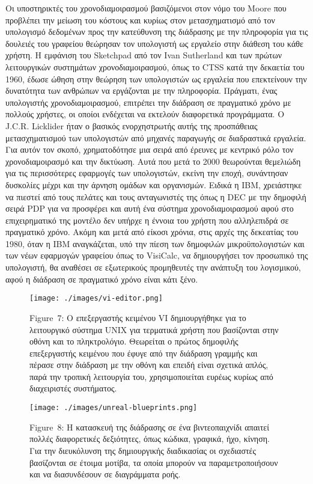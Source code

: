 \documentclass[
]{article}
\begin{document}
Οι υποστηρικτές του χρονοδιαμοιρασμού βασιζόμενοι στον νόμο του Moore
που προβλέπει την μείωση του κόστους και κυρίως στον μετασχηματισμό από
τον υπολογισμό δεδομένων προς την κατεύθυνση της διάδρασης με την
πληροφορία για τις δουλειές του γραφείου θεώρησαν τον υπολογιστή ως
εργαλείο στην διάθεση του κάθε χρήστη. Η εμφάνιση του Sketchpad από τον
Ivan Sutherland και των πρώτων λειτουργικών συστημάτων
χρονοδιαμοιρασμού, όπως το CTSS κατά την δεκαετία του 1960, έδωσε ώθηση
στην θεώρηση των υπολογιστών ως εργαλεία που επεκτείνουν την δυνατότητα
των ανθρώπων να εργάζονται με την πληροφορία. Πράγματι, ένας υπολογιστής
χρονοδιαμοιρασμού, επιτρέπει την διάδραση σε πραγματικό χρόνο με πολλούς
χρήστες, οι οποίοι ενδέχεται να εκτελούν διαφορετικά προγράμματα. Ο
J.C.R. Licklider ήταν ο βασικός ενορχηστρωτής αυτής της προσπάθειας
μετασχηματισμού των υπολογιστών από μηχανές παραγωγής σε διαδραστικά
εργαλεία. Για αυτόν τον σκοπό, χρηματοδότησε μια σειρά από έρευνες με
κεντρικό ρόλο τον χρονοδιαμοιρασμό και την δικτύωση. Αυτά που μετά το
2000 θεωρούνται θεμελιώδη για τις περισσότερες εφαρμογές των
υπολογιστών, εκείνη την εποχή, συνάντησαν δυσκολίες μέχρι και την άρνηση
ομάδων και οργανισμών. Ειδικά η IBM, χρειάστηκε να πιεστεί από τους
πελάτες και τους ανταγωνιστές της όπως η DEC με την δημοφιλή σειρά PDP
για να προσφέρει και αυτή ένα σύστημα χρονοδιαμοιρασμού αφού στο
επιχειρηματικό της μοντέλο δεν υπήρχε η έννοια του χρήστη που
αλληλεπιδρά σε πραγματικό χρόνο. Ακόμη και μετά από είκοσι χρόνια, στις
αρχές της δεκεατίας του 1980, όταν η ΙΒΜ αναγκάζεται, υπό την πίεση των
δημοφιλών μικροϋπολογιστών και των νέων εφαρμογών γραφείου όπως το
VisiCalc, να δημιουργήσει τον προσωπικό της υπολογιστή, θα αναθέσει σε
εξωτερικούς προμηθευτές την ανάπτυξη του λογισμικού, αφού η διάδραση σε
πραγματικό χρόνο είναι κάτι ξένο.

\leavevmode{}%
\begin{figure}
\hypertarget{fig:vi-editor}{%
\centering
\texttt{[image: ./images/vi-editor.png]}
\caption{Figure~7: Ο επεξεργαστής κειμένου VI δημιουργήθηκε για το
λειτουργικό σύστημα UNIX για τερματικά χρήστη που βασίζονται στην οθόνη
και το πληκτρολόγιο. Θεωρείται ο πρώτος δημοφιλής επεξεργαστής κειμένου
που έφυγε από την διάδραση γραμμής και πέρασε στην διάδραση με την οθόνη
και επειδή είναι σχετικά απλός, παρά την τροπική λειτουργία του,
χρησιμοποιείται ευρέως κυρίως από διαχειριστές
συστήματος.}\label{fig:vi-editor}
}
\end{figure}

\leavevmode{}%
\begin{figure}
\hypertarget{fig:unreal-blueprints}{%
\centering
\texttt{[image: ./images/unreal-blueprints.png]}
\caption{Figure~8: Η κατασκευή της διάδρασης σε ένα βιντεοπαιχνίδι
απαιτεί πολλές διαφορετικές δεξιότητες, όπως κώδικα, γραφικά, ήχο,
κίνηση. Για την διευκόλυνση της δημιουργικής διαδικασίας οι σχεδιαστές
βασίζονται σε έτοιμα μοτίβα, τα οποία μπορούν να παραμετροποιήσουν και
να διασυνδέσουν σε διαγράμματα ροής.}\label{fig:unreal-blueprints}
}
\end{figure}
\end{document}

